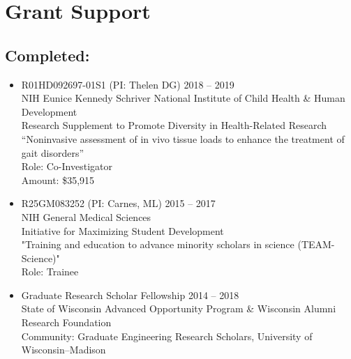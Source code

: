 \documentclass[letterpaper, 10pt]{article}
\begin{document}
\section{Grant Support}



\subsection{Completed:}
\begin{itemize}
    \item[] R01HD092697-01S1 (PI: Thelen DG) \hfill 2018 -- 2019\\ %
    NIH Eunice Kennedy Schriver National Institute of Child Health \& Human Development\\
    Research Supplement to Promote Diversity in Health-Related Research\\
    “Noninvasive assessment of in vivo tissue loads to enhance the treatment of gait disorders”\\
    Role: Co-Investigator\\
    Amount: \$35,915\\
    
    \item[] R25GM083252 (PI: Carnes, ML) \hfill 2015 -- 2017\\
    NIH General Medical Sciences\\
    Initiative for Maximizing Student Development\\
    "Training and education to advance minority scholars in science (TEAM-Science)"\\
    Role: Trainee\\
    
    \item[] Graduate Research Scholar Fellowship \hfill 2014 -- 2018\\
    State of Wisconsin Advanced Opportunity Program \& Wisconsin Alumni Research Foundation\\
    Community: Graduate Engineering Research Scholars, University of Wisconsin--Madison\\

\end{itemize}
\end{document}
